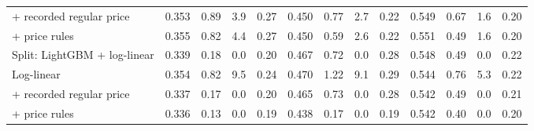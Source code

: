 \begin{table}[t]
\begin{adjustbox}{max width=\textwidth}
\begin{tabular}{lrrrrrrrrrrrr}
\quad + recorded regular price & 0.353 & 0.89 & 3.9 & 0.27 & 0.450 & 0.77 & 2.7 & 0.22 & 0.549 & 0.67 & 1.6 & 0.20 \\
\quad + price rules & 0.355 & 0.82 & 4.4 & 0.27 & 0.450 & 0.59 & 2.6 & 0.22 & 0.551 & 0.49 & 1.6 & 0.20 \\
Split: LightGBM \quad + log-linear & 0.339 & 0.18 & 0.0 & 0.20 & 0.467 & 0.72 & 0.0 & 0.28 & 0.548 & 0.49 & 0.0 & 0.22 \\
Log-linear & 0.354 & 0.82 & 9.5 & 0.24 & 0.470 & 1.22 & 9.1 & 0.29 & 0.544 & 0.76 & 5.3 & 0.22 \\
\quad + recorded regular price & 0.337 & 0.17 & 0.0 & 0.20 & 0.465 & 0.73 & 0.0 & 0.28 & 0.542 & 0.49 & 0.0 & 0.21 \\
\quad + price rules & 0.336 & 0.13 & 0.0 & 0.19 & 0.438 & 0.17 & 0.0 & 0.19 & 0.542 & 0.40 & 0.0 & 0.20 \\
\bottomrule
\end{tabular}
\end{adjustbox}
\end{table}
